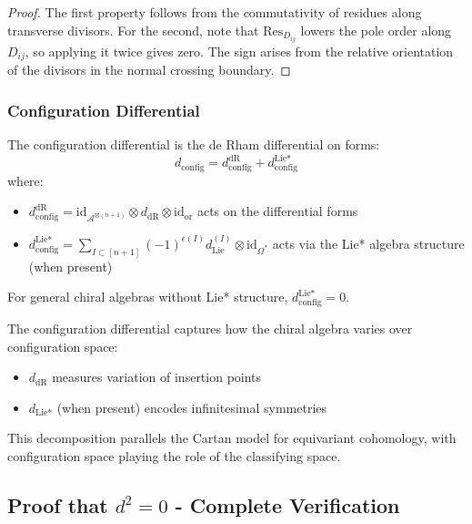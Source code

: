 \begin{proof}
The first property follows from the commutativity of residues along transverse divisors. For the second,
note that $\text{Res}_{D_{ij}}$ lowers the pole order along $D_{ij}$, so applying it twice gives zero.
The sign arises from the relative orientation of the divisors in the normal crossing boundary.
\end{proof}
 
\subsubsection{Configuration Differential}
 
\begin{definition}
   The configuration differential is the de Rham differential on forms:
   $$d_{\text{config}} = d_{\text{config}}^{\text{dR}} + d_{\text{config}}^{\text{Lie*}}$$
   where:
   \begin{itemize}
   \item $d_{\text{config}}^{\text{dR}} = \text{id}_{\mathcal{A}^{\boxtimes(n+1)}} \otimes d_{\text{dR}} \otimes \text{id}_{\text{or}}$ 
     acts on the differential forms
   \item $d_{\text{config}}^{\text{Lie*}} = \sum_{I \subset [n+1]} (-1)^{\epsilon(I)} d_{\text{Lie}}^{(I)} \otimes \text{id}_{\Omega^*}$ 
     acts via the Lie* algebra structure (when present)
   \end{itemize}
   
   For general chiral algebras without Lie* structure, $d_{\text{config}}^{\text{Lie*}} = 0$.
   \end{definition}
   
   \begin{remark}
   The configuration differential captures how the chiral algebra varies over configuration space:
   \begin{itemize}
   \item $d_{\text{dR}}$ measures variation of insertion points
   \item $d_{\text{Lie*}}$ (when present) encodes infinitesimal symmetries
   \end{itemize}
   
   This decomposition parallels the Cartan model for equivariant cohomology, with configuration space 
   playing the role of the classifying space.
   \end{remark}

\subsection{Proof that $d^2 = 0$ - Complete Verification}
 
